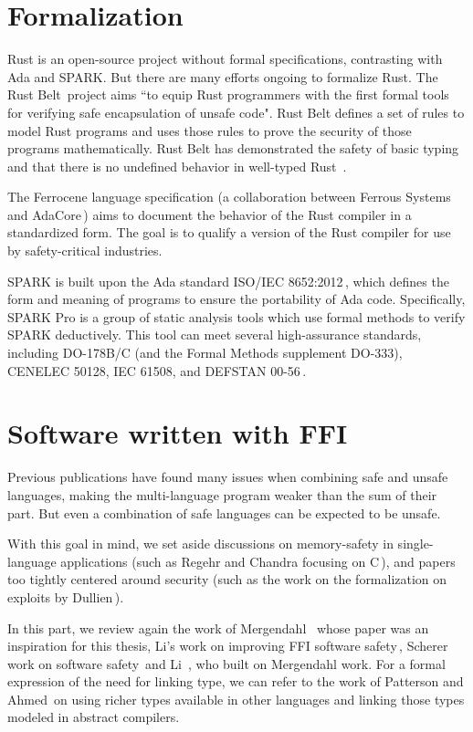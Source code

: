 \documentclass[nomenclature, english, bibtex]{kththesis}
\begin{document}
\section{Formalization}

Rust is an open-source project without formal specifications, contrasting with Ada and SPARK. But there are many efforts ongoing to formalize Rust. The Rust Belt\,\cite{jung_rustbelt_2018} project aims ``to equip Rust programmers with the first formal tools for verifying safe encapsulation of unsafe code". Rust Belt defines a set of rules to model Rust programs and uses those rules to prove the security of those programs mathematically. Rust Belt has demonstrated the safety of basic typing and that there is no undefined behavior in well-typed Rust \,\cite{xu_memory-safety_2021}. 

The Ferrocene language specification (a collaboration between Ferrous Systems and AdaCore\,\cite{noauthor_ferrocene_2023}) aims to document the behavior of the Rust compiler in a standardized form. The goal is to qualify a version of the Rust compiler for use by safety-critical industries.

SPARK is built upon the Ada standard ISO/IEC 8652:2012\,\cite{1400-1700_isoiec_2013}, which defines the form and meaning of programs to ensure the portability of Ada code. Specifically, SPARK Pro is a group of static analysis tools which use formal methods to verify SPARK deductively. This tool can meet several high-assurance standards, including DO-178B/C (and the Formal Methods supplement DO-333), CENELEC 50128, IEC 61508, and DEFSTAN 00-56\,\cite{jaloyan_safe_2017}.

\section{Software written with FFI}

Previous publications have found many issues when combining safe and unsafe languages, making the multi-language program weaker than the sum of their part. But even a combination of safe languages can be expected to be unsafe.

With this goal in mind, we set aside discussions on \gls{memory-safety} in single-language applications (such as Regehr \etal and Chandra \etal focusing on C\,\cite{regehr_efficient_2006,chandra_physical_1999}), and papers too tightly centered around security (such as the work on the formalization on exploits by Dullien\,\cite{dullien_weird_2020}). 

In this part, we review again the work of Mergendahl \etal\,\cite{mergendahl_cross-language_2022} whose paper was an inspiration for this thesis, Li's work on improving FFI software safety\,\cite{li_improving_2014}, Scherer work on software safety\,\cite{scherer_engineering_2021} and Li \etal\,\cite{li_detecting_2022}, who built on Mergendahl \etal work. For a formal expression of the need for linking type, we can refer to the work of Patterson and Ahmed\,\cite{patterson_linking_2017} on using richer types available in other languages and linking those types modeled in abstract compilers.
\end{document}
